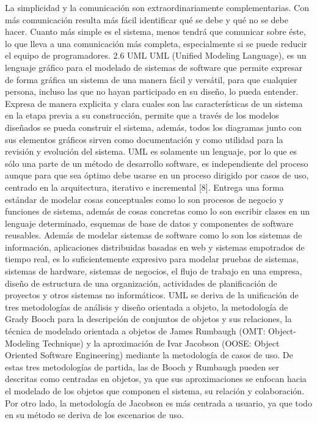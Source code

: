 La simplicidad y la comunicación son extraordinariamente complementarias. Con más comunicación resulta más fácil identificar qué se debe y qué no se debe hacer. Cuanto más simple es el sistema, menos tendrá que comunicar sobre éste, lo que lleva a una comunicación más completa, especialmente si se puede reducir el equipo de programadores.
2.6	UML
UML (Unified Modeling Language), es un lenguaje gráfico para el modelado de sistemas de software que permite expresar de forma gráfica un sistema de una manera fácil y versátil, para que cualquier persona, incluso las que no hayan participado en su diseño, lo pueda entender. Expresa de manera explicita y clara cuales son las características de un sistema en la etapa previa a su construcción, permite que a través de los modelos diseñados se pueda construir el sistema, además, todos los diagramas junto con sus elementos gráficos sirven como documentación y como utilidad para la revisión y evolución del sistema. UML es solamente un lenguaje, por lo que es sólo una parte de un método de desarrollo software, es independiente del proceso aunque para que sea óptimo debe usarse en un proceso dirigido por casos de uso, centrado en la arquitectura, iterativo e incremental [8].
Entrega una forma estándar de modelar cosas conceptuales como lo son procesos de negocio y funciones de sistema, además de cosas concretas como lo son escribir clases en un lenguaje determinado, esquemas de base de datos y componentes de software reusables.
Además de modelar sistemas de software como lo son los sistemas de información, aplicaciones distribuidas basadas en web y sistemas empotrados de tiempo real, es lo suficientemente expresivo para modelar pruebas de sistemas, sistemas de hardware, sistemas de negocios, el flujo de trabajo en una empresa, diseño de estructura de una organización, actividades de planificación de proyectos y otros sistemas no informáticos.
UML se deriva de la unificación de tres metodologías de análisis y diseño orientada a objeto, la metodología de Grady Booch para la descripción de conjuntos de objetos y sus relaciones, la técnica de modelado orientada a objetos de James Rumbaugh (OMT: Object-Modeling Technique) y la aproximación de Ivar Jacobson (OOSE: Object Oriented Software Engineering) mediante la metodología de casos de uso. De estas tres metodologías de partida, las de Booch y Rumbaugh pueden ser descritas como centradas en objetos, ya que sus aproximaciones se enfocan hacia el modelado de los objetos que componen el sistema, su relación y colaboración. Por otro lado, la metodología de Jacobson es más centrada a usuario, ya que todo en su método se deriva de los escenarios de uso.

